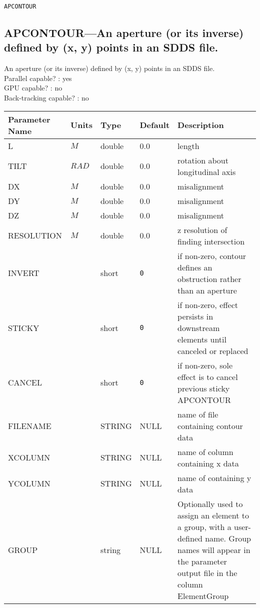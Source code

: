 \vspace*{0.5in}

\newpage
\begin{center}{\Large\verb|APCONTOUR|}\end{center}
\subsection{APCONTOUR---An aperture (or its inverse) defined by (x, y) points in an SDDS file.}
An aperture (or its inverse) defined by (x, y) points in an SDDS file.
\\
Parallel capable? : yes\\
GPU capable? : no\\
Back-tracking capable? : no\\
\begin{tabular}{|l|l|l|l|p{\descwidth}|} \hline
Parameter Name & Units & Type & Default & Description \\ \hline 
L & $M$ & double &  0.0 & length  \\ \hline 
TILT & $RAD$ & double &  0.0 & rotation about longitudinal axis  \\ \hline 
DX & $M$ & double &  0.0 & misalignment  \\ \hline 
DY & $M$ & double &  0.0 & misalignment  \\ \hline 
DZ & $M$ & double &  0.0 & misalignment  \\ \hline 
RESOLUTION & $M$ & double &  0.0 & z resolution of finding intersection  \\ \hline 
INVERT &  & short &  \verb|0| & if non-zero, contour defines an obstruction rather than an aperture  \\ \hline 
STICKY &  & short &  \verb|0| & if non-zero, effect persists in downstream elements until canceled or replaced  \\ \hline 
CANCEL &  & short &  \verb|0| & if non-zero, sole effect is to cancel previous sticky APCONTOUR  \\ \hline 
FILENAME &  & STRING &   NULL            & name of file containing contour data  \\ \hline 
XCOLUMN &  & STRING &   NULL            & name of column containing x data  \\ \hline 
YCOLUMN &  & STRING &   NULL            & name of containing y data  \\ \hline 
GROUP &  & string & NULL & Optionally used to assign an element to a group, with a user-defined name.  Group names will appear in the parameter output file in the column ElementGroup  \\ \hline 
\end{tabular}

